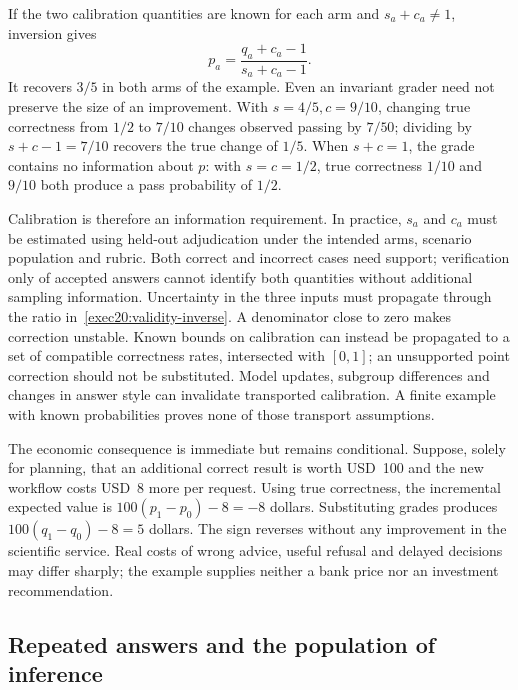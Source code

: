 If the two calibration quantities are known for each arm and
$s_a+c_a\ne1$, inversion gives
\begin{equation}
 p_a=\frac{q_a+c_a-1}{s_a+c_a-1}.
 \label{exec20:validity-inverse}
\end{equation}
It recovers $3/5$ in both arms of the example. Even an invariant grader need
not preserve the size of an improvement. With $s=4/5,c=9/10$, changing true
correctness from $1/2$ to $7/10$ changes observed passing by $7/50$; dividing
by $s+c-1=7/10$ recovers the true change of $1/5$. When $s+c=1$, the grade
contains no information about $p$: with $s=c=1/2$, true correctness $1/10$
and $9/10$ both produce a pass probability of $1/2$.
\citep{exec20_validity_reference}

Calibration is therefore an information requirement. In practice, $s_a$ and
$c_a$ must be estimated using held-out adjudication under the intended arms,
scenario population and rubric. Both correct and incorrect cases need support;
verification only of accepted answers cannot identify both quantities without
additional sampling information. Uncertainty in the three inputs must propagate
through the ratio in~\eqref{exec20:validity-inverse}. A denominator close to
zero makes correction unstable. Known bounds on calibration can instead be
propagated to a set of compatible correctness rates, intersected with $[0,1]$;
an unsupported point correction should not be substituted. Model updates,
subgroup differences and changes in answer style can invalidate transported
calibration. A finite example with known probabilities proves none of those
transport assumptions.

The economic consequence is immediate but remains conditional. Suppose, solely
for planning, that an additional correct result is worth USD~100 and the new
workflow costs USD~8 more per request. Using true correctness, the incremental
expected value is $100(p_1-p_0)-8=-8$ dollars. Substituting grades produces
$100(q_1-q_0)-8=5$ dollars. The sign reverses without any improvement in the
scientific service. Real costs of wrong advice, useful refusal and delayed
decisions may differ sharply; the example supplies neither a bank price nor an
investment recommendation. \citep{exec20_validity_reference}

\subsection{Repeated answers and the population of inference}
\label{exec20:validity-dependence}

